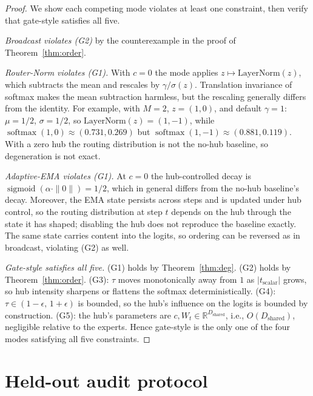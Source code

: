 \documentclass[10pt]{article}
\newcommand{\softmax}{\operatorname{softmax}}
\newcommand{\sigmoid}{\operatorname{sigmoid}}
\newcommand{\R}{\mathbb{R}}
\theoremstyle{definition}
\theoremstyle{plain}
\theoremstyle{remark}
\begin{document}
\begin{proof}
We show each competing mode violates at least one constraint, then verify that gate-style satisfies all five.

\emph{Broadcast violates (G2)} by the counterexample in the proof of Theorem~\ref{thm:order}.

\emph{Router-Norm violates (G1).} With $c = 0$ the mode applies $z \mapsto \mathrm{LayerNorm}(z)$, which subtracts the mean and rescales by $\gamma / \sigma(z)$. Translation invariance of softmax makes the mean subtraction harmless, but the rescaling generally differs from the identity. For example, with $M = 2$, $z = (1, 0)$, and default $\gamma = 1$: $\mu = 1/2$, $\sigma = 1/2$, so $\mathrm{LayerNorm}(z) = (1, -1)$, while $\softmax(1, 0) \approx (0.731, 0.269)$ but $\softmax(1, -1) \approx (0.881, 0.119)$. With a zero hub the routing distribution is not the no-hub baseline, so degeneration is not exact.

\emph{Adaptive-EMA violates (G1).} At $c = 0$ the hub-controlled decay is $\sigmoid(\alpha \cdot \|0\|) = 1/2$, which in general differs from the no-hub baseline's decay. Moreover, the EMA state persists across steps and is updated under hub control, so the routing distribution at step $t$ depends on the hub through the state it has shaped; disabling the hub does not reproduce the baseline exactly. The same state carries content into the logits, so ordering can be reversed as in broadcast, violating (G2) as well.

\emph{Gate-style satisfies all five.} (G1) holds by Theorem~\ref{thm:deg}. (G2) holds by Theorem~\ref{thm:order}. (G3): $\tau$ moves monotonically away from $1$ as $|t_{\text{scalar}}|$ grows, so hub intensity sharpens or flattens the softmax deterministically. (G4): $\tau \in (1 - \epsilon,\, 1 + \epsilon)$ is bounded, so the hub's influence on the logits is bounded by construction. (G5): the hub's parameters are $c, W_t \in \R^{D_{\text{shared}}}$, i.e., $O(D_{\text{shared}})$, negligible relative to the experts. Hence gate-style is the only one of the four modes satisfying all five constraints.
\end{proof}

\section{Held-out audit protocol}
\label{app:audit}
\end{document}
